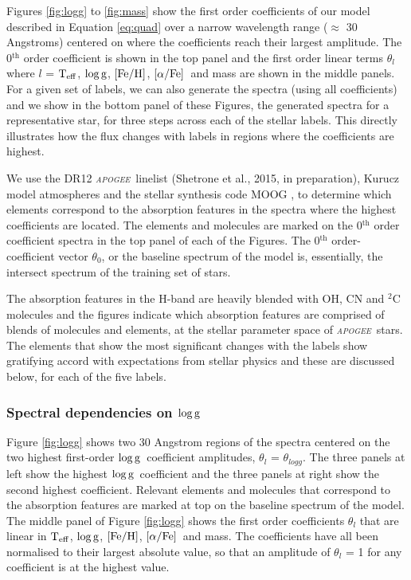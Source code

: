 \documentclass[12pt, preprint]{aastex}
\newcommand{\project}[1]{\textsl{#1}}
\newcommand{\apogee}{\project{\textsc{apogee}}}
\newcommand{\teff}{\mbox{$\rm T_{eff}$}}
\newcommand{\feh}{\mbox{$\rm [Fe/H]$}}
\newcommand{\alphafe}{\mbox{$\rm [\alpha/Fe]$}}
\newcommand{\logg}{\mbox{$\rm \log g$}}
\begin{document}
Figures \ref{fig:logg} to \ref{fig:mass} show the first order coefficients of our model described in Equation \ref{eq:quad} over a narrow wavelength range ($\approx$ 30 Angstroms) centered on where the coefficients reach their largest amplitude. The 0$^{\mbox{th}}$ order coefficient is shown in the top panel and the first order linear terms $\theta_l$ where $l$ = \teff, \logg, \feh, \alphafe\ and mass are shown in the middle panels. For a given set of labels, we can also generate the spectra (using all coefficients) and we  show in the bottom panel of these Figures, the generated spectra for a representative star, for three steps across each of the stellar labels. This directly illustrates how the flux changes with labels in regions where the coefficients are highest.  

We use the DR12 \apogee\ linelist (Shetrone et al., 2015, in preparation), Kurucz model atmospheres \citep{castelli2004} and the stellar synthesis code MOOG \citep{sneden1979}, to determine which elements correspond to the absorption features in the spectra where the highest coefficients are located. The elements and molecules are marked on the 0$^{\mbox{th}}$ order coefficient spectra in the top panel of each of the Figures. The 0$^{\mbox{th}}$ order-coefficient vector $\theta_0$, or the baseline spectrum of the model is, essentially, the intersect spectrum of the training set of stars. 

The absorption features in the H-band are heavily blended with OH, CN and $^2$C molecules and the figures indicate which absorption features are comprised of blends of molecules and elements, at the stellar parameter space of \apogee\ stars. The elements that show the most significant changes with the labels show gratifying accord with expectations from stellar physics and these are discussed below, for each of the five labels. 

\subsubsection{Spectral dependencies on \logg} 

Figure \ref{fig:logg} shows two 30 Angstrom regions of the spectra centered on the two highest first-order \logg\ coefficient amplitudes, $\theta_l$ = $\theta_{logg}$. The three panels at left show the highest \logg\ coefficient and the three panels at right show the second highest coefficient. Relevant elements and molecules that correspond to the absorption features are marked at top on the baseline spectrum of the model.  The middle panel of Figure \ref{fig:logg} shows the first order coefficients $\theta_l$ that are linear in \teff, \logg, \feh, \alphafe\ and mass. The coefficients have all been normalised to their largest absolute value, so that an amplitude of $\theta_l$ = 1 for any coefficient is at the highest value.  
\end{document}
